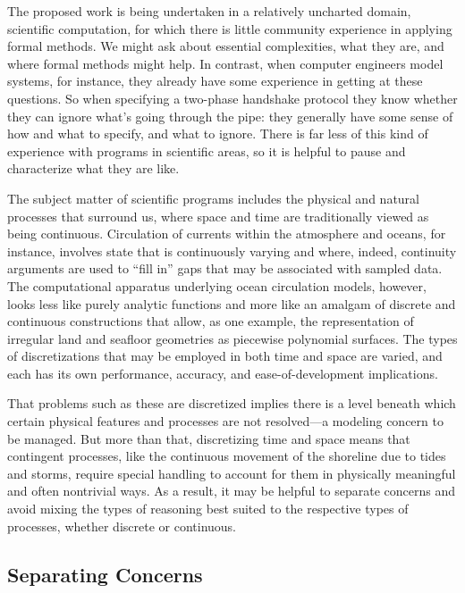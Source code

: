 \documentclass[12pt]{article}
\begin{document}
The proposed work is being undertaken in a relatively uncharted
domain, scientific computation, for which there is little community
experience in applying formal methods.  We might ask about essential
complexities, what they are, and where formal methods might help.  In
contrast, when computer engineers model systems, for instance, they
already have some experience in getting at these questions.  So when
specifying a two-phase handshake protocol they know whether they can
ignore what's going through the pipe: they generally have some sense
of how and what to specify, and what to ignore.  There is far less of
this kind of experience with programs in scientific areas, so it is
helpful to pause and characterize what they are like.

The subject matter of scientific programs includes the physical and
natural processes that surround us, where space and time are
traditionally viewed as being continuous.  Circulation of currents
within the atmosphere and oceans, for instance, involves state
that is continuously varying and where, indeed, continuity arguments
are used to ``fill in'' gaps that may be associated with sampled data.
The computational apparatus underlying ocean circulation models,
however, looks less like purely analytic functions and more like an
amalgam of discrete and continuous constructions that allow, as one
example, the representation of irregular land and seafloor geometries
as piecewise polynomial surfaces.  The types of discretizations that
may be employed in both time and space are varied, and each has its
own performance, accuracy, and ease-of-development implications.

That problems such as these are discretized implies there is a level
beneath which certain physical features and processes are not
resolved---a modeling concern to be managed.  But more than that,
discretizing time and space means that contingent processes, like the
continuous movement of the shoreline due to tides and storms, require
special handling to account for them in physically meaningful and
often nontrivial ways.  As a result, it may be helpful to separate
concerns and avoid mixing the types of reasoning best suited to the
respective types of processes, whether discrete or continuous.

\subsection{Separating Concerns}

\def\direct{By direct methods, we mean those that produce an exact
  solution, modulo rounding errors, in a finite number of steps.
  Iterative methods, on the other hand, successively approximate a
  solution, gradually improving it until convergence is reached.}
\end{document}
